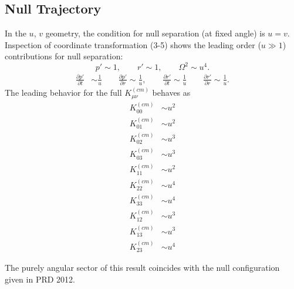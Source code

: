 \documentclass[10pt,letterpaper]{article}
\begin{document}
\subsection*{Null Trajectory}
In the $u$, $v$ geometry, the condition for null separation (at fixed angle) is $u=v$. Inspection of coordinate transformation (3-5) shows the leading order ($u\gg 1$) contributions for null separation:
\begin{equation}
p' \sim 1,\qquad r' \sim 1,\qquad \Omega^2 \sim u^4.
\end{equation}
\begin{align}
\frac{\partial p'}{\partial t} & \sim  \frac{1}{u}\qquad
\frac{\partial p'}{\partial r}  \sim 	\frac{1}{u},\qquad
\frac{\partial r'}{\partial t}  \sim \frac{1}{u}\qquad
\frac{\partial r'}{\partial r}  \sim  \frac{1}{u}.
\end{align}
The leading behavior for the full $K_{\mu\nu}^{(cm)}$ behaves as
\begin{align}
K^{(cm)}_{00} &\sim u^2 \nonumber\\
K^{(cm)}_{01} &\sim  u^2\nonumber\\
K^{(cm)}_{02} &\sim  u^3\nonumber\\
K^{(cm)}_{03} &\sim   u^3\nonumber\\
K^{(cm)}_{11} &\sim  u^2\nonumber\\
K^{(cm)}_{22} &\sim  u^4\nonumber\\
K^{(cm)}_{33} &\sim  u^4\nonumber\\
K^{(cm)}_{12} &\sim u^3\nonumber\\
K^{(cm)}_{13} &\sim u^3\nonumber\\
K^{(cm)}_{23} &\sim u^4
\end{align}

The purely angular sector of this result coincides with the null configuration given in PRD 2012.
\end{document}
